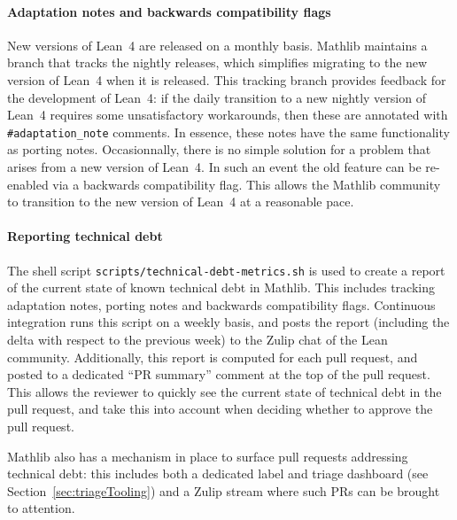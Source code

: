 \documentclass[runningheads]{llncs}
\def\Mathlib{Mathlib\xspace}
\def\mathlib{Mathlib\xspace}
\begin{document}
\paragraph{Adaptation notes and backwards compatibility flags}
New versions of Lean~4 are released on a monthly basis.
\Mathlib maintains a branch that tracks the nightly releases, which simplifies migrating to the new version of Lean~4 when it is released.
This tracking branch provides feedback for the development of Lean~4:
if the daily transition to a new nightly version of Lean~4
requires some unsatisfactory workarounds,
then these are annotated with \texttt{\#adaptation\_note} comments.
In essence, these notes have the same functionality as porting notes.
Occasionnally, there is no simple solution for a problem that arises from a new version of Lean~4.
In such an event the old feature can be re-enabled via a backwards compatibility flag.
This allows the \mathlib community to transition to the new version of Lean~4 at a reasonable pace.


\paragraph{Reporting technical debt}
The shell script \texttt{scripts/technical-debt-metrics.sh} is used to create a report of the current state of known technical debt in \mathlib.
This includes tracking adaptation notes, porting notes and backwards compatibility flags.
Continuous integration runs this script on a weekly basis, and posts the report (including the delta with respect to the previous week) to the Zulip chat of the Lean community.
Additionally, this report is computed for each pull request, and posted to a dedicated ``PR summary'' comment at the top of the pull request.
This allows the reviewer to quickly see the current state of technical debt in the pull request, and take this into account when deciding whether to approve the pull request.

\Mathlib also has a mechanism in place to surface pull requests addressing technical debt: this includes both a dedicated label and triage dashboard (see Section~\ref{sec:triageTooling}) and a Zulip stream where such PRs can be brought to attention.
\end{document}
